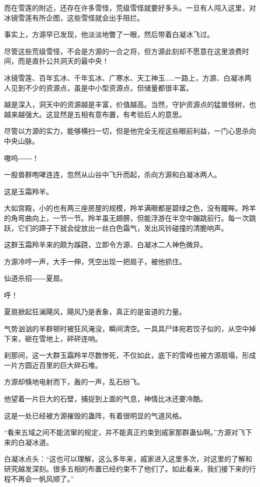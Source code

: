 \begin{this_body}
而在雪莲的附近，还存在许多雪怪，荒级雪怪就要好多头。一旦有人闯入这里，对冰镜雪莲有所企图，这些雪怪就会出手阻拦。

事实上，方源早已发现，他淡淡地瞥了一眼，然后带着白凝冰飞过。

尽管这些荒级雪怪，不会是方源的一合之将，但方源此刻却不愿意在这里浪费时间，而是直扑公共洞天的最中央！

冰镜雪莲、百年玄冰、千年玄冰、广寒水、天工神玉……一路上，方源、白凝冰两人见到不少的资源点，虽是中小型资源点，但储量都很丰富。

越是深入，洞天中的资源越是丰富，价值越高。当然，守护资源点的猛兽怪树，也越来越强大。这显然是五相有意布置，有考验后人的意思。

尽管以方源的实力，能够横扫一切，但是他完全无视这些眼前利益，一门心思杀向中央山脉。

嗷呜――！

一股兽群咆哮连连，忽然从山谷中飞升而起，杀向方源和白凝冰两人。

这是玉霜羚羊。

大如宫殿，小的也有两三座房屋的规模，羚羊满眼都是碧绿之色，没有瞳眸。羚羊的角弯曲向上，一节一节。羚羊虽无翅膀，但能浮游在半空中蹦跳前行。每一次跳跃，它们的蹄子下就会绽放出一丝白色霜气，发出风铃碰撞的清脆响声。

这群玉霜羚羊来的颇为蹊跷，立即令方源、白凝冰二人神色微异。

方源冷哼一声，大手一伸，凭空出现一把扇子，被他抓住。

仙道杀招――夏扇。

呼！

夏扇掀起狂澜飓风，飓风乃是表象，真正的是宙道的力量。

气势汹汹的羊群顿时被狂风淹没，瞬间清空。一具具尸体宛若饺子似的，从空中掉下来，砸在雪地上，砰砰连响。

刹那间，这一大群玉霜羚羊尽数惨死，不仅如此，底下的雪峰也被方源扇塌，形成一片方圆近百里的巨大碎石堆。

方源却倏地电射而下，轰的一声，乱石纷飞。

他望着一片巨大的石壁，捕捉到上面的气息，神情比冰还要冷酷。

这是一处已经被方源摧毁的蛊阵，有着很明显的气道风格。

“看来五域之间不能流窜的规定，并不能真正约束到戚家那群蛊仙啊。”方源对飞下来的白凝冰道。

白凝冰点头：“这也可以理解，这么多年来，戚家进入这里多次，对这里的了解和研究越发深刻。很多五相的布置已经约束不了他们了。如此看来，我们接下来的行程不再会一帆风顺了。”


\end{this_body}
